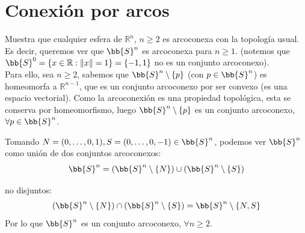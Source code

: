 \setcounter{section}{-1}
\section{Conexión por arcos}

\begin{ejercicio}
    Muestra que cualquier esfera de $\mathbb{R}^n$, $n\geq 2$ es arcoconexa con la topología usual.\\

    \noindent
    Es decir, queremos ver que $\bb{S}^n$ es arcoconexa para $n\geq 1$. \newline (notemos que $\bb{S}^0 = \{x\in \mathbb{R} : \|x\| = 1\} = \{-1,1\}$ no es un conjunto arcoconexo).\\

    \noindent
    Para ello, sea $n\geq 2$, sabemos que $\bb{S}^n\setminus\{p\}$ (con $p\in \bb{S}^n$) es homeomorfa a $\mathbb{R}^{n-1}$, que es un conjunto arcoconexo por ser convexo (es una espacio vectorial). Como la arcoconexión es una propiedad topológica, esta se conserva por homeomorfismo, luego $\bb{S}^n\setminus \{p\}$ es un conjunto arcoconexo, $\forall p\in \bb{S}^n$.

    Tomando $N = (0,\ldots,0,1), S =(0,\ldots,0,-1) \in \bb{S}^n$, podemos ver $\bb{S}^n$ como unión de dos conjuntos arcoconexos:
    \begin{equation*}
        \bb{S}^n = (\bb{S}^n\setminus\{N\}) \cup (\bb{S}^n\setminus\{S\})
    \end{equation*}

    no disjuntos:
    \begin{equation*}
        (\bb{S}^n\setminus\{N\}) \cap (\bb{S}^n\setminus\{S\}) = \bb{S}^n\setminus\{N,S\}
    \end{equation*}
    Por lo que $\bb{S}^n$ es un conjunto arcoconexo, $\forall n\geq 2$.
\end{ejercicio}

